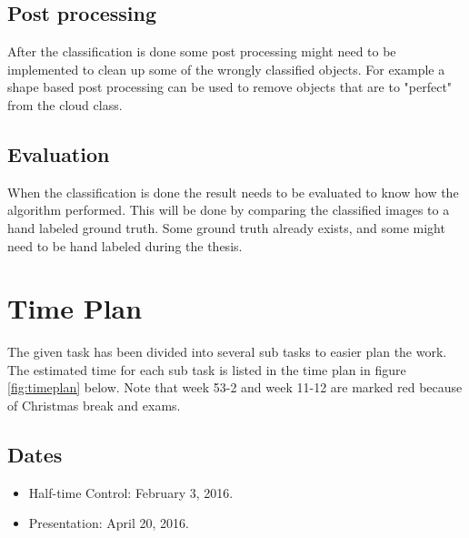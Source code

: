\documentclass{article}
\begin{document}
\subsection{Post processing}

After the classification is done some post processing might need to be implemented to clean up some of the wrongly classified objects. For example a shape based post processing can be used to remove objects that are to "perfect" from the cloud class.

\subsection{Evaluation}
When the classification is done the result needs to be evaluated to know how the algorithm performed. This will be done by comparing the classified images to a hand labeled ground truth. Some ground truth already exists, and some might need to be hand labeled during the thesis. 

\section{Time Plan}
The given task has been divided into several sub tasks to easier plan the work. The estimated time for each sub task is listed in the time plan in figure \ref{fig:timeplan} below.
Note that week 53-2 and week 11-12 are marked red because of Christmas break and exams.


\subsection{Dates}
\begin{itemize}
\item Half-time Control: February 3, 2016.
\item Presentation: April 20, 2016.
\end{itemize}
\end{document}
